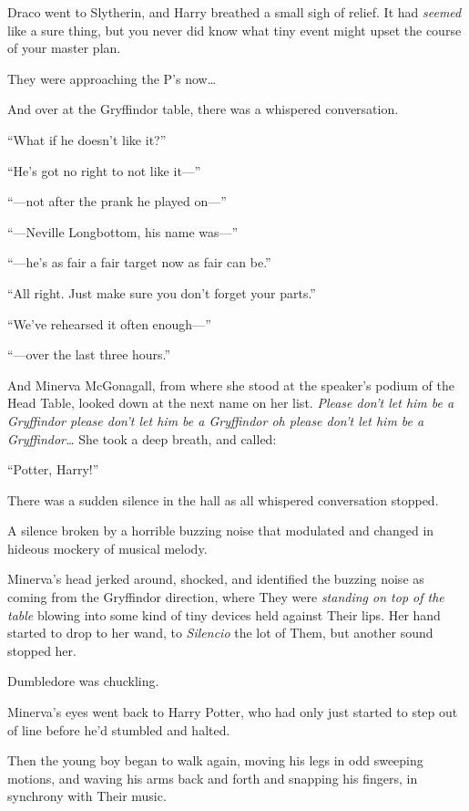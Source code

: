 \later

Draco went to Slytherin, and Harry breathed a small sigh of relief. It had \emph{seemed} like a sure thing, but you never did know what tiny event might upset the course of your master plan.

They were approaching the P’s now…

And over at the Gryffindor table, there was a whispered conversation.

\begin{em}
“What if he doesn’t like it?”

“He’s got no right to not like it—”

“—not after the prank he played on—”

“—Neville Longbottom, his name was—”

“—he’s as fair a fair target now as fair can be.”

“All right. Just make sure you don’t forget your parts.”

“We’ve rehearsed it often enough—”

“—over the last three hours.”
\end{em}

And Minerva McGonagall, from where she stood at the speaker’s podium of the Head Table, looked down at the next name on her list. \emph{Please don’t let him be a Gryffindor please don’t let him be a Gryffindor \emph{oh please} don’t let him be a Gryffindor…} She took a deep breath, and called:

“Potter, Harry!”

There was a sudden silence in the hall as all whispered conversation stopped.

A silence broken by a horrible buzzing noise that modulated and changed in hideous mockery of musical melody.

Minerva’s head jerked around, shocked, and identified the buzzing noise as coming from the Gryffindor direction, where They were \emph{standing on top of the table} blowing into some kind of tiny devices held against Their lips. Her hand started to drop to her wand, to \emph{Silencio} the lot of Them, but another sound stopped her.

Dumbledore was chuckling.

Minerva’s eyes went back to Harry Potter, who had only just started to step out of line before he’d stumbled and halted.

Then the young boy began to walk again, moving his legs in odd sweeping motions, and waving his arms back and forth and snapping his fingers, in synchrony with Their music.

